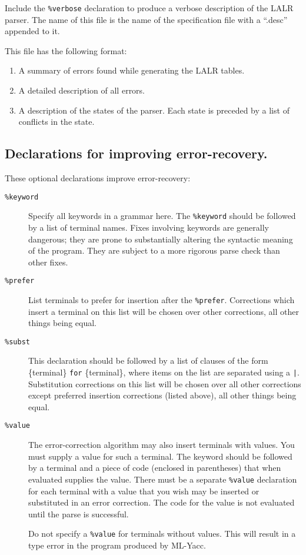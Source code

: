 \begin{description}
Include the {\tt \%verbose} declaration to produce a verbose
description of the LALR parser.   The name of this file is
the name of the specification file with a ``.desc'' appended to it.

     This file has the following format:
\begin{enumerate}

\item A summary of errors found while generating the LALR tables.
\item A detailed description of all errors.
\item A description of the states of the parser.  Each state
        is preceded by a list of conflicts in the state.

\end{enumerate}
\end{description}

\subsection{Declarations for improving error-recovery.}

These optional declarations improve error-recovery:

\begin{description}
\item[{\tt \%keyword}]
    Specify all keywords in a grammar here.  The {\tt \%keyword}
    should be followed by a list
    of terminal names.   Fixes involving keywords are generally dangerous;
    they are prone to substantially altering the syntactic meaning
    of the program.  They are subject to a more rigorous parse check than
    other fixes.

\item[{\tt \%prefer}]
     List terminals to prefer for insertion after the {\tt \%prefer}.
Corrections which insert a terminal on this list will be chosen over
other corrections, all other things being equal.
\item[{\tt \%subst}]
        This declaration should be followed by a list of clauses of the
     form \{terminal\} {\tt for} \{terminal\}, where items on the list are
     separated using a {\tt |}.  Substitution corrections on this list
will be chosen over all other corrections except preferred insertion
corrections (listed above), all other things being equal.
\item[{\tt \%value}]
        The error-correction algorithm may also insert terminals with values.
     You must supply a value for such a terminal. The keyword
     should be followed by a terminal and a piece of
     code (enclosed in parentheses) that when evaluated supplies the value. 
     There must be a separate {\tt \%value} declaration for each terminal with
     a value that you wish may be inserted or substituted in an error correction.
     The code for the value is not evaluated until the parse is
     successful.

         Do not specify a {\tt \%value} for terminals without
     values. This will result in a type error in the program produced by
     ML-Yacc.
\end{description}

